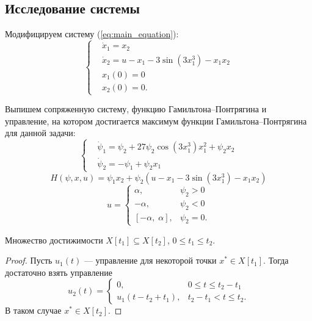 \subsection{Исследование системы}

Модифицируем систему (\ref{eq:main_equation}):
\begin{equation} \label{eq:main_system}
        \left\{
        \begin{aligned}
                & \dot x_1 = x_2 \\
                & \dot x_2 = u - x_1 - 3 \sin(3x_1^3) - x_1 x_2 \\
                & x_1(0) = 0 \\
                & x_2(0) = 0.
        \end{aligned}
        \right.
\end{equation}

Выпишем сопряженную систему, функцию Гамильтона--Понтрягина и управление, на котором достигается максимум функции Гамильтона--Понтрягина для данной задачи:
\begin{equation} \label{eq:congugate_system}
        \left\{
        \begin{aligned}
                & \dot\psi_1 = \psi_2 + 27\psi_2\cos(3x_1^3)x_1^2 + \psi_2 x_2 \\
                & \dot \psi_2 = -\psi_1 + \psi_2 x_1
        \end{aligned}
        \right.
\end{equation}
\begin{equation}
        H(\psi, x, u) = \psi_1 x_2 + \psi_2(u - x_1 - 3\sin(3x_1^3) - x_1x_2)
\end{equation}
\begin{equation}
        u = 
        \begin{cases}
                \alpha, &\psi_2 > 0 \\
                -\alpha, &\psi_2 < 0 \\
                [-\alpha,\;\alpha], &\psi_2 = 0.
        \end{cases}
\end{equation}

\begin{assertion}
        Множество достижимости $X[t_1] \subseteq X[t_2]$, $0 \leqslant t_1 \leqslant t_2$.
\end{assertion}
\begin{proof}
        Пусть $u_1(t)$ --- управление для некоторой точки  $x^* \in X[t_1]$. Тогда достаточно взять управление
        $$
                u_2(t) = 
                \begin{cases}
                        0, & 0 \leqslant t \leqslant t_2 - t_1 \\
                        u_1(t - t_2 + t_1), & t_2 - t_1 < t \leqslant t_2.
                \end{cases}
        $$
        В таком случае $x^* \in X[t_2]$.
\end{proof}

